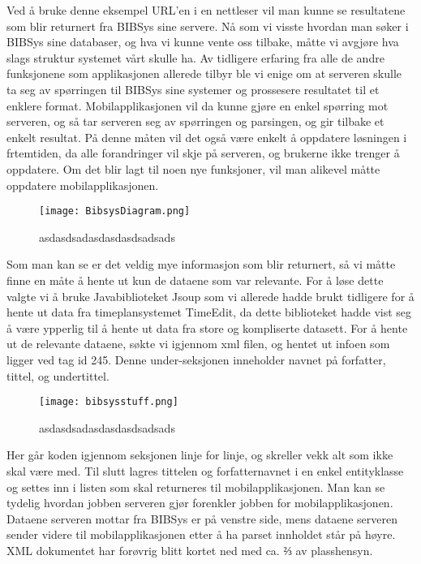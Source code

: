 \documentclass[../main.tex]{subfiles}
\begin{document}
Ved å bruke denne eksempel URL’en i en nettleser vil man kunne se resultatene som blir returnert fra BIBSys sine servere.\newline
\newline
Nå som vi visste hvordan man søker i BIBSys sine databaser, og hva vi kunne vente oss tilbake, måtte vi avgjøre hva slags struktur systemet vårt skulle ha. Av tidligere erfaring fra alle de andre funksjonene som applikasjonen allerede tilbyr ble vi enige om at serveren skulle ta seg av spørringen til BIBSys sine systemer og prossesere resultatet til et enklere format. Mobilapplikasjonen vil da kunne gjøre en enkel spørring mot serveren, og så tar serveren seg av spørringen og parsingen, og gir tilbake et enkelt resultat. På denne måten vil det også være enkelt å oppdatere løsningen i frtemtiden, da alle forandringer vil skje på serveren, og brukerne ikke trenger å oppdatere. Om det blir lagt til noen nye funksjoner, vil man alikevel måtte oppdatere mobilapplikasjonen.

\begin{figure}[H]
  \centering
  \texttt{[image: BibsysDiagram.png]}
  \caption{asdasdsadasdasdasdsadsads}
\end{figure}

Som man kan se er det veldig mye informasjon som blir returnert, så vi måtte finne en måte å hente ut kun de dataene som var relevante. For å løse dette valgte vi å bruke Javabiblioteket Jsoup som vi allerede hadde brukt tidligere for å hente ut data fra timeplansystemet TimeEdit, da dette biblioteket hadde vist seg å være ypperlig til å hente ut data fra store og kompliserte datasett.\newline
\newline
For å hente ut de relevante dataene, søkte vi igjennom xml filen, og hentet ut infoen som ligger ved tag id 245. Denne under-seksjonen inneholder navnet på forfatter, tittel, og undertittel.
\begin{figure}[H]
  \centering
  \texttt{[image: bibsysstuff.png]}
  \caption{asdasdsadasdasdasdsadsads}
\end{figure}

Her går koden igjennom seksjonen linje for linje, og skreller vekk alt som ikke skal være med. Til slutt lagres tittelen og forfatternavnet i en enkel entityklasse og settes inn i listen som skal returneres til mobilapplikasjonen.\newline
\newline
Man kan se tydelig hvordan jobben serveren gjør forenkler jobben for mobilapplikasjonen. Dataene serveren mottar fra BIBSys er på venstre side, mens dataene serveren sender videre til mobilapplikasjonen etter å ha parset innholdet står på høyre. XML dokumentet har forøvrig blitt kortet ned med ca. ⅔  av plasshensyn.
\end{document}
